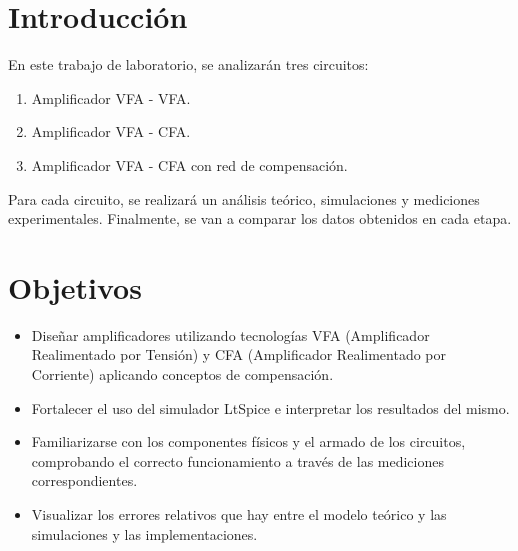 \newpage
\section{Introducción}
En este trabajo de laboratorio, se analizarán tres circuitos: 
\begin{enumerate}
	\item Amplificador VFA - VFA.
	\item Amplificador VFA - CFA.
	\item Amplificador VFA - CFA con red de compensación.
\end{enumerate}
Para cada circuito, se realizará un análisis teórico, simulaciones y mediciones experimentales. Finalmente, se van a comparar los datos obtenidos en cada etapa.

\section{Objetivos}
\begin{itemize}
	\item Diseñar amplificadores utilizando tecnologías VFA (Amplificador Realimentado por Tensión) y CFA (Amplificador Realimentado por Corriente) aplicando conceptos de compensación.
	\item Fortalecer el uso del simulador LtSpice e interpretar los resultados del mismo.
	\item Familiarizarse con los componentes físicos y el armado de los circuitos, comprobando el correcto funcionamiento a través de las mediciones correspondientes.
	\item Visualizar los errores relativos que hay entre el modelo teórico y las simulaciones y las implementaciones.
	
\end{itemize}
